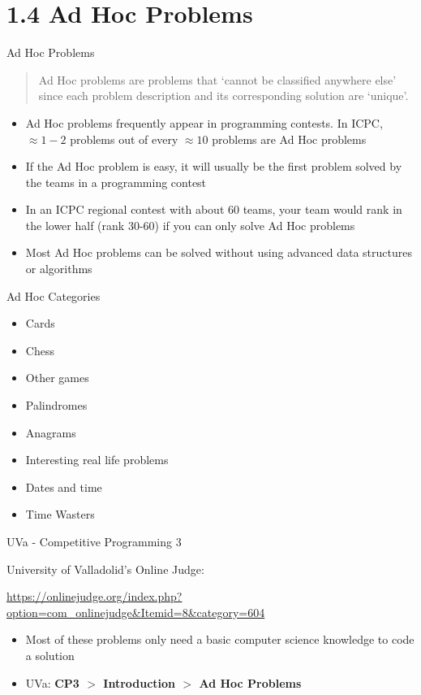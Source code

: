 \documentclass{beamer}
\begin{document}
\section{1.4 Ad Hoc Problems}

\begin{frame}{Ad Hoc Problems}
    \begin{quote}
        Ad Hoc problems are problems that ‘cannot be classified anywhere else’ since each problem description and its corresponding solution are ‘unique’.
    \end{quote}
    \begin{itemize}
        \item Ad Hoc problems frequently appear in programming contests. In ICPC, $\approx 1-2$ problems out of every $\approx 10$ problems are Ad Hoc problems
        \item If the Ad Hoc problem is easy, it will usually be the first problem solved by the teams in a programming contest
        \item In an ICPC regional contest with about 60 teams, your team would rank in the lower half (rank 30-60) if you can only solve Ad Hoc problems
        \item Most Ad Hoc problems can be solved without using advanced data structures or algorithms
    \end{itemize}
\end{frame}

\begin{frame}{Ad Hoc Categories}
    \begin{itemize}
        \item Cards
        \item Chess
        \item Other games
        \item Palindromes
        \item Anagrams
        \item Interesting real life problems
        \item Dates and time
        \item Time Wasters
    \end{itemize}
\end{frame}

\begin{frame}{UVa - Competitive Programming 3}
    
    University of Valladolid's Online Judge: 
    
    \url{https://onlinejudge.org/index.php?option=com_onlinejudge&Itemid=8&category=604}
    
    \begin{itemize}
        \item Most of these problems only need a basic computer science knowledge to code a solution
        \item UVa: \textbf{CP3 $>$ Introduction $>$ Ad Hoc Problems}
    \end{itemize}
\end{frame}
\end{document}
